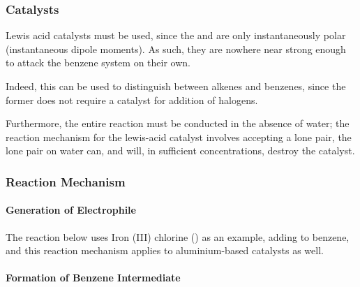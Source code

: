 			\subsubsection{Catalysts}

				Lewis acid catalysts must be used, since the  and \ch{\chlorine-\chlorine} are only instantaneously polar (instantaneous
				dipole moments). As such, they are nowhere near strong enough to attack the benzene system on their own.

				Indeed, this can be used to distinguish between alkenes and benzenes, since the former does not require a catalyst for addition
				of halogens.

				Furthermore, the entire reaction must be conducted in the absence of water; the reaction mechanism for the lewis-acid catalyst
				involves accepting a lone pair, the lone pair on water can, and will, in sufficient concentrations, destroy the catalyst.




			\subsubsection{Reaction Mechanism}

				\paragraph{Generation of Electrophile}

				The reaction below uses Iron (III) chlorine () as an example, adding \ch{\chlorine} to benzene,
				and this reaction mechanism applies to aluminium-based catalysts as well.



				\pagebreak

				\paragraph{Formation of Benzene Intermediate}

